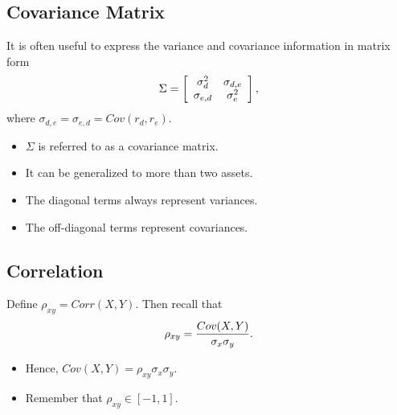 \documentclass[letterpaper,10pt,english]{sphinxmanual}
\begin{document}
\subsection{Covariance Matrix}
\label{portfolioOpt:covariance-matrix}
It is often useful to express the variance and covariance information
in matrix form
\begin{gather}
\begin{split}\Sigma = \left[\begin{array}{cc} \sigma^2_d & \sigma_{d,e}
      \\ \sigma_{e,d} & \sigma^2_e \end{array} \right],\end{split}\notag
\end{gather}
where $\sigma_{d,e} = \sigma_{e,d} = Cov(r_d, r_e)$.
\begin{itemize}
\item {} 
$\Sigma$ is referred to as a covariance matrix.

\end{itemize}
\begin{itemize}
\item {} 
It can be generalized to more than two assets.

\end{itemize}
\begin{itemize}
\item {} 
The diagonal terms always represent variances.

\end{itemize}
\begin{itemize}
\item {} 
The off-diagonal terms represent covariances.

\end{itemize}


\subsection{Correlation}
\label{portfolioOpt:correlation}
Define $\rho_{xy} = Corr(X,Y)$.  Then recall that
\begin{gather}
\begin{split}\rho_{xy} = \frac{Cov(X,Y)}{\sigma_x \sigma_y}.\end{split}\notag
\end{gather}\begin{itemize}
\item {} 
Hence, $Cov(X,Y) = \rho_{xy} \sigma_x \sigma_y$.

\end{itemize}
\begin{itemize}
\item {} 
Remember that $\rho_{xy} \in [-1,1]$.

\end{itemize}
\end{document}
